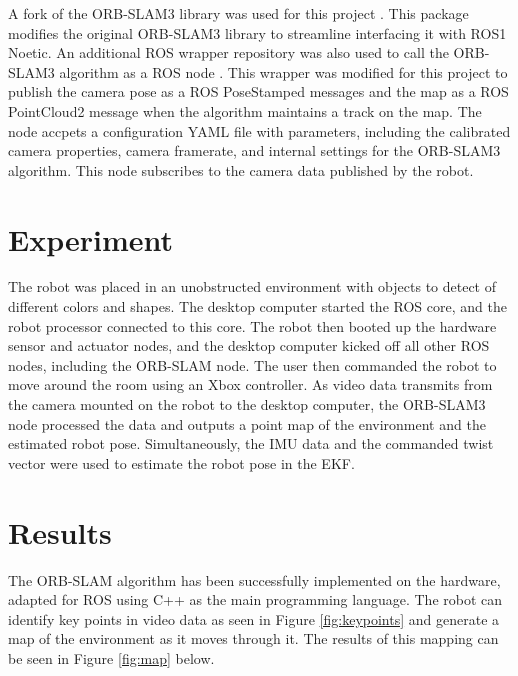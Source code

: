 \documentclass[twocolumn]{article}
\begin{document}
A fork of the ORB-SLAM3 library was used for this project \cite{orb_slam_ros}. This package modifies the original ORB-SLAM3 library to streamline interfacing it with ROS1 Noetic. An additional ROS wrapper repository was also used to call the ORB-SLAM3 algorithm as a ROS node \cite{orb_slam_ros_wrapper}. This wrapper was modified for this project to publish the camera pose as a ROS PoseStamped messages \cite{posestamped} and the map as a ROS PointCloud2 message \cite{pointcloud2} when the algorithm maintains a track on the map. The node accpets a configuration YAML file with parameters, including the calibrated camera properties, camera framerate, and internal settings for the ORB-SLAM3 algorithm. This node subscribes to the camera data published by the robot.


\section{Experiment}

The robot was placed in an unobstructed environment with objects to detect of different colors and shapes. The desktop computer started the ROS core, and the robot processor connected to this core. The robot then booted up the hardware sensor and actuator nodes, and the desktop computer kicked off all other ROS nodes, including the ORB-SLAM node. The user then commanded the robot to move around the room using an Xbox controller. As video data transmits from the camera mounted on the robot to the desktop computer, the ORB-SLAM3 node processed the data and outputs a point map of the environment and the estimated robot pose. Simultaneously, the IMU data and the commanded twist vector were used to estimate the robot pose in the EKF.

\section{ Results}
The ORB-SLAM algorithm has been successfully implemented on the hardware, adapted for ROS using C++ as the main programming language. The robot can identify key points in video data as seen in Figure \ref{fig:keypoints} and generate a map of the environment as it moves through it. The results of this mapping can be seen in Figure \ref{fig:map} below.

\end{document}
